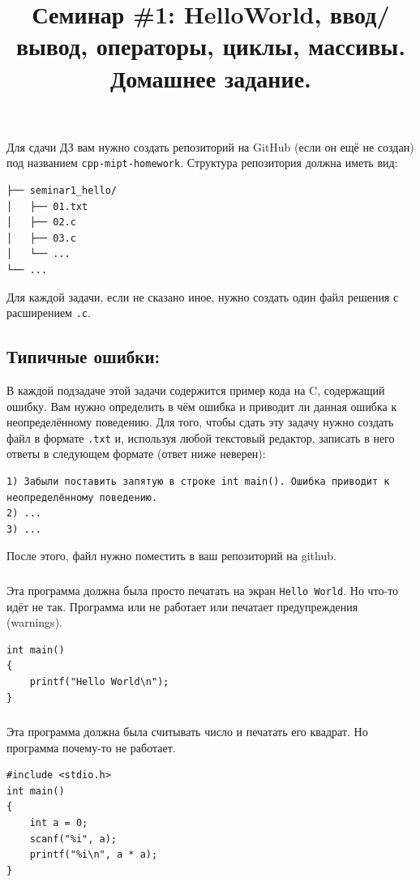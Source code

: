 \documentclass[10pt]{article}
\begin{document}
\title{Семинар \#1: HelloWorld, ввод/вывод, операторы, циклы, массивы. Домашнее задание.\vspace{-5ex}}\date{}\maketitle
\noindent Для сдачи ДЗ вам нужно создать репозиторий на GitHub (если он ещё не создан) под названием \texttt{cpp-mipt-homework}. Структура репозитория должна иметь вид:
\begin{center}
\begin{BVerbatim}
├── seminar1_hello/
│   ├── 01.txt
│   ├── 02.c
│   ├── 03.c
│   └── ...
└── ...
\end{BVerbatim}
\end{center}
Для каждой задачи, если не сказано иное, нужно создать один файл решения с расширением \texttt{.c}.

\subsection{Типичные ошибки:} 
\noindent В каждой подзадаче этой задачи содержится пример кода на C, содержащий ошибку. Вам нужно определить в чём ошибка и приводит ли данная ошибка к неопределённому поведению.
Для того, чтобы сдать эту задачу нужно создать файл в формате \texttt{.txt} и, используя любой текстовый редактор, записать в него ответы в следующем формате (ответ ниже неверен):
\begin{verbatim}
1) Забыли поставить запятую в строке int main(). Ошибка приводит к неопределённому поведению.
2) ...
3) ...
\end{verbatim} 
После этого, файл нужно поместить в ваш репозиторий на github.

\subsubsection{}
Эта программа должна была просто печатать на экран \texttt{Hello World}. Но что-то идёт не так. Программа или не работает или печатает предупреждения (warnings).
\begin{lstlisting}
int main()
{
    printf("Hello World\n");
}
\end{lstlisting}

\subsubsection{}
Эта программа должна была считывать число и печатать его квадрат.
Но программа почему-то не работает.
\begin{lstlisting}
#include <stdio.h>
int main()
{
    int a = 0;
    scanf("%i", a);
    printf("%i\n", a * a);
}
\end{lstlisting}
\end{document}
